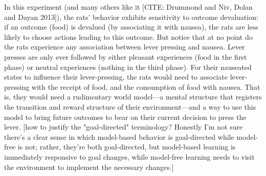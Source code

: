 In this experiment (and many others like it [CITE: Drummond and Niv, Dolan and Dayan 2013]), the rats' behavior exhibits sensitivity to outcome devaluation: if an outcome (food) is devalued (by associating it with nausea), the rats are less likely to choose actions leading to this outcome.
But notice that at no point do the rats experience any association between lever pressing and nausea.
Lever presses are only ever followed by either pleasant experiences (food in the first phase) or neutral experiences (nothing in the third phase).
For their nauseated states to influence their lever-pressing, the rats would need to associate lever-pressing with the receipt of food, and the consumption of food with nausea.
That is, they would need a rudimentary world model---a mental structure that registers the transition and reward structure of their environment---and a way to use this model to bring future outcomes to bear on their current decision to press the lever.
[how to justify the "goal-directed" terminology? Honestly I'm not sure there's a clear sense in which model-based behavior is goal-directed while model-free is not; rather, they're both goal-directed, but model-based learning is immediately responsive to goal changes, while model-free learning needs to visit the environment to implement the necessary changes.]



%

